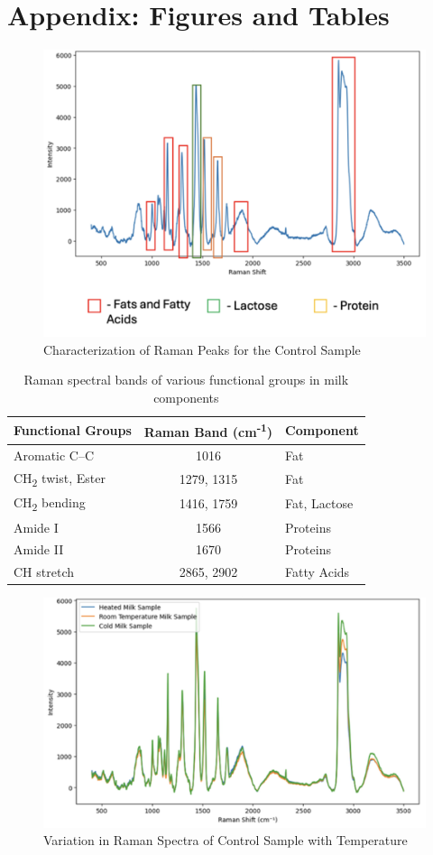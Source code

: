 %

\clearpage
\appendix
\section{Appendix: Figures and Tables}

\begin{figure}[h!]
    \centering
    \includegraphics[width=0.5\linewidth]{Figures/Screenshot 2025-07-16 at 2.26.41 PM.png}
    \caption{Characterization of Raman Peaks for the Control Sample}
    \label{fig:ram}
\end{figure}

\begin{table}[h!]
\centering
\begin{tabular}{|l|c|l|}
\hline
\textbf{Functional Groups} & \textbf{Raman Band (cm\textsuperscript{-1})} & \textbf{Component} \\
\hline
Aromatic C--C & 1016 & Fat \\
CH\textsubscript{2} twist, Ester & 1279, 1315 & Fat \\
CH\textsubscript{2} bending & 1416, 1759 & Fat, Lactose \\
Amide I & 1566 & Proteins \\
Amide II & 1670 & Proteins \\
CH stretch & 2865, 2902 & Fatty Acids \\
\hline
\end{tabular}
\caption{Raman spectral bands of various functional groups in milk components}
\label{tab:raman_bands}
\end{table}


\begin{figure}[h!]
    \centering
    \includegraphics[width=0.5\linewidth]{Figures/Screenshot 2025-07-16 at 2.27.09 PM.png}
    \caption{Variation in Raman Spectra of Control Sample with Temperature}
    \label{fig:temp}
\end{figure}

